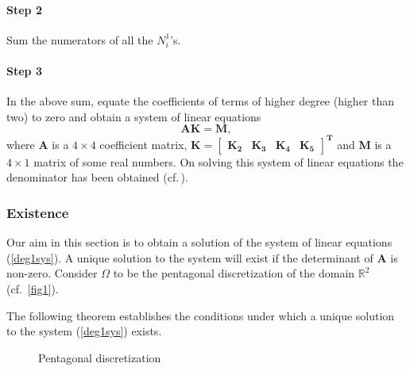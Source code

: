 \documentclass[automatic-bibliography]{univsciauth}
\begin{document}
\paragraph{\textbf{Step 2}} Sum the numerators of all the $N_i^1$'s.
\paragraph{\textbf{Step 3}} In the above sum, equate the coefficients of terms
of higher degree (higher than two) to zero and obtain a system of linear
equations
\begin{equation}
  \mathbf{AK=M},\label{deg1sys}
\end{equation}
where $\mathbf{A}$ is a $4\times4$ coefficient matrix,
$\mathbf{K=\left[\begin{array}{cccc}K_2&K_3&K_4&K_5\end{array}\right]^T}$ and
\textbf{M} is a $4\times1$ matrix of some real numbers.
On solving this system of linear equations the denominator has been obtained (cf.\,\cite{das}).
\subsubsection{Existence}

Our aim in this section is to obtain a solution of the system of linear
equations (\autoref{deg1sys}). A unique solution to the system will exist if the
determinant of $\mathbf{A}$ is non-zero. Consider $\Omega$ to be the pentagonal
discretization of the domain $\mathbb{R}^2$ (cf.~\autoref{fig1}).

The following theorem establishes the conditions under which a unique solution
to the system (\autoref{deg1sys}) exists.

\begin{figure}[b!]
  \centering
  \caption{Pentagonal discretization}\label{fig1}
\end{figure}
\end{document}
